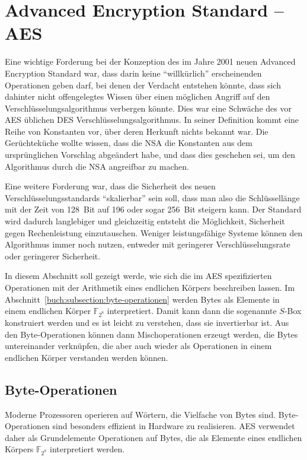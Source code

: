 %
%
%
\section{Advanced Encryption Standard -- AES
\label{buch:section:aes}}
Eine wichtige Forderung bei der Konzeption des im Jahre 2001 neuen
Advanced Encryption Standard war, dass darin keine ``willkürlich''
erscheinenden Operationen geben darf, bei denen der Verdacht
entstehen könnte, dass sich dahinter nicht offengelegtes Wissen
über einen möglichen Angriff auf den Verschlüsselungsalgorithmus
verbergen könnte.
Dies war eine Schwäche des vor AES üblichen DES Verschlüsselungsalgorithmus.
In seiner Definition kommt eine Reihe von Konstanten vor, über deren
Herkunft nichts bekannt war.
Die Gerüchteküche wollte wissen, dass die NSA die Konstanten aus dem
ursprünglichen Vorschlag abgeändert habe, und dass dies geschehen sei,
um den Algorithmus durch die NSA angreifbar zu machen.

Eine weitere Forderung war, dass die Sicherheit des neuen
Verschlüsselungsstandards ``skalierbar'' sein soll, dass man also
die Schlüssellänge mit der Zeit von 128~Bit auf 196 oder sogar 256~Bit
steigern kann.
Der Standard wird dadurch langlebiger und gleichzeitig entsteht die
Möglichkeit, Sicherheit gegen Rechenleistung einzutauschen.
Weniger leistungsfähige Systeme können den Algorithmus immer noch
nutzen, entweder mit geringerer Verschlüsselungsrate oder geringerer
Sicherheit.

In diesem Abschnitt soll gezeigt werde, wie sich die im AES
spezifizierten Operationen mit der Arithmetik 
eines endlichen Körpers beschreiben lassen.
Im Abschnitt~\ref{buch:subsection:byte-operationen} werden
Bytes als Elemente in einem endlichen Körper $\mathbb{F}_{2^8}$
interpretiert.
Damit kann dann die sogenannte $S$-Box konstruiert werden und
es ist leicht zu verstehen, dass sie invertierbar ist.
Aus den Byte-Operationen können dann Mischoperationen erzeugt
werden, die Bytes untereinander verknüpfen, die aber auch wieder
als Operationen in einem endlichen Körper verstanden werden können.

\subsection{Byte-Operationen
\label{buch:subsection:byte-operationen}}
Moderne Prozessoren operieren auf Wörtern, die Vielfache von Bytes sind.
Byte-Operationen sind besonders effizient in Hardware zu realisieren.
AES verwendet daher als Grundelemente Operationen auf Bytes, die als
Elemente eines endlichen Körpers $\mathbb{F}_{2^8}$ interpretiert werden.


